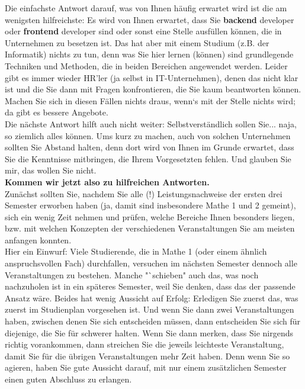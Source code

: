 Die einfachste Antwort darauf, was von Ihnen häufig erwartet wird ist die am wenigsten hilfreichste: Es wird von Ihnen erwartet, dass Sie \textbf{backend} developer oder \textbf{frontend} developer sind oder sonst eine Stelle ausfüllen können, die in Unternehmen zu besetzen ist. Das hat aber mit einem Studium (z.B. der Informatik) nichts zu tun, denn was Sie hier lernen (können) sind grundlegende Techniken und Methoden, die in beiden Bereichen angewendet werden. Leider gibt es immer wieder HR’ler (ja selbst in IT-Unternehmen), denen das nicht klar ist und die Sie dann mit Fragen konfrontieren, die Sie kaum beantworten können. Machen Sie sich in diesen Fällen nichts draus, wenn‘s mit der Stelle nichts wird; da gibt es bessere Angebote.\\

Die nächste Antwort hilft auch nicht weiter: Selbstverständlich sollen Sie... naja, so ziemlich alles können. Ums kurz zu machen, auch von solchen Unternehmen sollten Sie Abstand halten, denn dort wird von Ihnen im Grunde erwartet, dass Sie die Kenntnisse mitbringen, die Ihrem Vorgesetzten fehlen. Und glauben Sie mir, das wollen Sie nicht.\\

\textbf{Kommen wir jetzt also zu hilfreichen Antworten.}\\

Zunächst sollten Sie, nachdem Sie alle (!) Leistungsnachweise der ersten drei Semester erworben haben (ja, damit sind insbesondere Mathe 1 und 2 gemeint), sich ein wenig Zeit nehmen und prüfen, welche Bereiche Ihnen besonders liegen, bzw. mit welchen Konzepten der verschiedenen Veranstaltungen Sie am meisten anfangen konnten.\\

Hier ein Einwurf: Viele Studierende, die in Mathe 1 (oder einem ähnlich anspruchsvollen Fach) durchfallen, versuchen im nächsten Semester dennoch alle Veranstaltungen zu bestehen. Manche "`schieben" auch das, was noch nachzuholen ist in ein späteres Semester, weil Sie denken, dass das der passende Ansatz wäre. Beides hat wenig Aussicht auf Erfolg: Erledigen Sie zuerst das, was zuerst im Studienplan vorgesehen ist. Und wenn Sie dann zwei Veranstaltungen haben, zwischen denen Sie sich entscheiden müssen, dann entscheiden Sie sich für diejenige, die Sie für schwerer halten. Wenn Sie dann merken, dass Sie nirgends richtig vorankommen, dann streichen Sie die jeweils leichteste Veranstaltung, damit Sie für die übrigen Veranstaltungen mehr Zeit haben. Denn wenn Sie so agieren, haben Sie gute Aussicht darauf, mit nur einem zusätzlichen Semester einen guten Abschluss zu erlangen.\\

